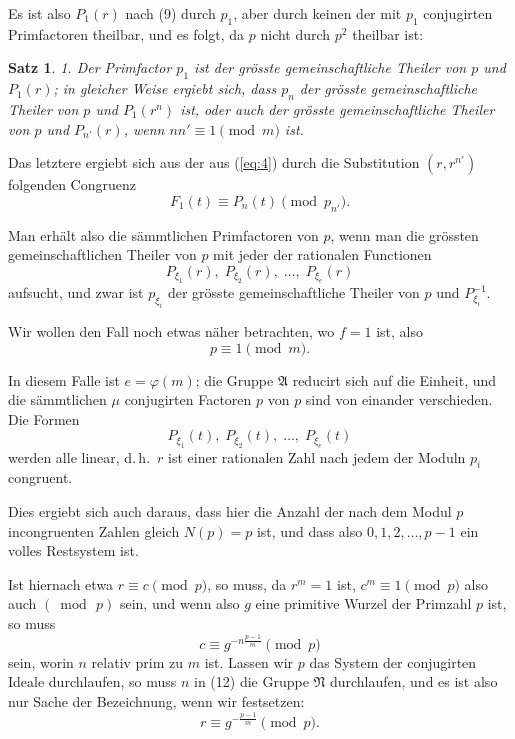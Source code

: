 \documentclass[12pt,a4paper]{article}
\newtheorem*{satz}{Satz}
\begin{document}
Es ist also $P_1(r)$ nach (9) durch $p_1$, aber durch keinen der mit $p_1$ conjugirten Primfactoren theilbar, und es folgt, da $p$ nicht durch $p^2$ theilbar ist:

\begin{satz}
1. Der Primfactor $p_1$ ist der grösste gemeinschaftliche Theiler von $p$ und $P_1(r)$; in gleicher Weise ergiebt sich, dass $p_n$ der grösste gemeinschaftliche Theiler von $p$ und $P_1(r^n)$ ist, oder auch der grösste gemeinschaftliche Theiler von $p$ und $P_{n'}(r)$, wenn $nn' \equiv 1 \pmod{m}$ ist.
\end{satz}

Das letztere ergiebt sich aus der aus (\ref{eq:4}) durch die Substitution $(r, r^{n'})$ folgenden Congruenz
\[
F_1(t) \equiv P_n(t) \pmod{p_{n'}}.
\]

Man erhält also die sämmtlichen Primfactoren von $p$, wenn man die grössten gemeinschaftlichen Theiler von $p$ mit jeder der rationalen Functionen
\begin{equation}\label{eq:10}
P_{\xi_1}(r),\; P_{\xi_2}(r),\; \ldots,\; P_{\xi_e}(r)
\end{equation}
aufsucht, und zwar ist $p_{\xi_i}$ der grösste gemeinschaftliche Theiler von $p$ und $P_{\xi_i}^{-1}$.

Wir wollen den Fall noch etwas näher betrachten, wo $f = 1$ ist, also
\begin{equation}\label{eq:11}
p \equiv 1 \pmod{m}.
\end{equation}

In diesem Falle ist $e = \varphi(m)$; die Gruppe $\mathfrak{A}$ reducirt sich auf die Einheit, und die sämmtlichen $\mu$ conjugirten Factoren $p$ von $p$ sind von einander verschieden. Die Formen
\[
P_{\xi_1}(t),\; P_{\xi_2}(t),\; \ldots,\; P_{\xi_e}(t)
\]
werden alle linear, d.\,h.\ $r$ ist einer rationalen Zahl nach jedem der Moduln $p_i$ congruent.

Dies ergiebt sich auch daraus, dass hier die Anzahl der nach dem Modul $p$ incongruenten Zahlen gleich $N(p) = p$ ist, und dass also $0, 1, 2, \ldots, p-1$ ein volles Restsystem ist.

Ist hiernach etwa $r \equiv c \pmod{p}$, so muss, da $r^m = 1$ ist, $c^m \equiv 1 \pmod{p}$ also auch $(\bmod\, p)$ sein, und wenn also $g$ eine primitive Wurzel der Primzahl $p$ ist, so muss
\begin{equation}\label{eq:12}
c \equiv g^{-n\frac{p-1}{m}} \pmod{p}
\end{equation}
sein, worin $n$ relativ prim zu $m$ ist. Lassen wir $p$ das System der conjugirten Ideale durchlaufen, so muss $n$ in (12) die Gruppe $\mathfrak{N}$ durchlaufen, und es ist also nur Sache der Bezeichnung, wenn wir festsetzen:
\begin{equation}\label{eq:13}
r \equiv g^{-\frac{p-1}{m}} \pmod{p}.
\end{equation}
\end{document}
